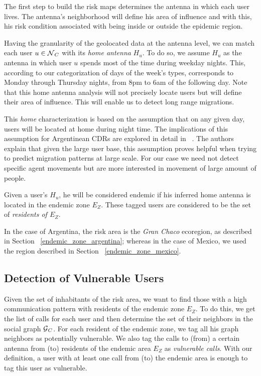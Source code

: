 The first step to build the risk maps determines the antenna in which each user lives. The antenna's neighborhood will define his area of influence and with this, his risk condition associated with being inside or outside the epidemic region.

Having the granularity of the geolocated data at the antenna level, we can match each user $u \in \operatorname{\mathcal{N}}_C$ with its \textit{home antenna} $H_u$. To do so, we assume $H_u$ as the antenna in which user $u$ spends most of the time during weekday nights. This, according to our categorization of days of the week's types, corresponds to Monday through Thursday nights, from 8pm to 6am of the following day. Note that this home antenna analysis will not precisely locate users but will define their area of influence. This will enable us to detect long range migrations.

This \textit{home} characterization is based on the assumption that on any given day, users will be located at home during night time. The implications of this assumption for Argentinean CDRs are explored in detail in ~\cite{sarraute2015socialevents,csaji2012exploring}. The authors explain that given the large user base, this assumption proves helpful when trying to predict migration patterns at large scale. For our case we need not detect specific agent movements but are more interested in movement of large amount of people.

Given a user's $H_u$, he will be considered endemic if his inferred home antenna is located in the endemic zone $E_Z$. These tagged users are considered to be the set of \textit{residents of $E_Z$}.

In the case of Argentina, the risk area is the \textit{Gran Chaco} ecoregion, as described in Section~ \cref{endemic_zone_argentina};
whereas in the case of Mexico, we used the region described in Section~ \cref{endemic_zone_mexico}.


\subsection{Detection of Vulnerable Users}

Given the set of inhabitants of the risk area, we want to find those with a high communication pattern with residents of the endemic zone $E_Z$. To do this, we get the list of calls for each user and then determine the set of their neighbors in the social graph $\operatorname{\mathcal{G}}_C$. For each resident of the endemic zone, we tag all his graph neighbors as potentially vulnerable. We also tag the calls to (from) a certain antenna from (to) residents of the endemic area $E_Z$ as \textit{vulnerable calls}. With our definition, a user with at least one call from (to) the endemic area is enough to tag this user as vulnerable.

